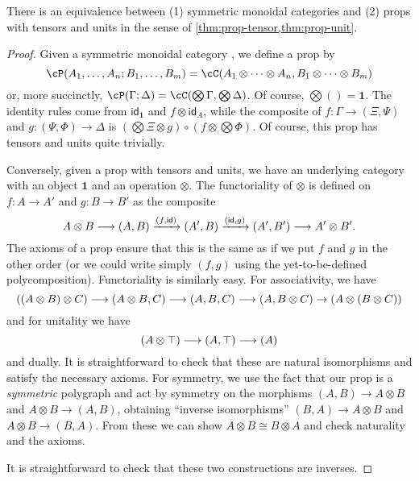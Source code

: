 \documentclass{book}
\def\idfunc{\mathsf{id}}
\def\unit{\top}%
\def\one{\mathbf{1}}
\let\tensor\otimes
\let\bigtensor\bigotimes
\begin{document}
\begin{thm}\label{thm:prop-smc}
  There is an equivalence between (1) symmetric monoidal categories and (2) props with tensors and units in the sense of \cref{thm:prop-tensor,thm:prop-unit}.
\end{thm}
\begin{proof}
  Given a symmetric monoidal category \cC, we define a prop \cP by
  \[ \cP(A_1,\dots,A_n ; B_1,\dots,B_m) = \cC(A_1\tensor \cdots\tensor A_n, B_1\tensor\cdots\tensor B_m)\]
  or, more succinctly, $\cP(\Gamma;\Delta) = \cC(\bigtensor\Gamma, \bigtensor\Delta)$.
  Of course, $\bigtensor() = \one$.
  The identity rules come from $\idfunc_\one$ and $f\tensor \idfunc_A$, while the composite of $f:\Gamma\to (\Xi,\Psi)$ and $g:(\Psi,\Phi)\to \Delta$ is $(\bigtensor\Xi \tensor g) \circ (f\tensor \bigtensor \Phi)$.
  Of course, this prop has tensors and units quite trivially.

  Conversely, given a prop with tensors and units, we have an underlying category with an object $\one$ and an operation $\tensor$.
  The functoriality of $\tensor$ is defined on $f:A\to A'$ and $g:B\to B'$ as the composite
  \[ A\tensor B \too (A,B) \xto{(f,\idfunc)} (A',B) \xto{(\idfunc,g)} (A',B') \too A'\tensor B'. \]
  The axioms of a prop ensure that this is the same as if we put $f$ and $g$ in the other order (or we could write simply $(f,g)$ using the yet-to-be-defined polycomposition).
  Functoriality is similarly easy.
  For associativity, we have
  \[ ((A\tensor B)\tensor C) \too (A\tensor B,C) \too (A,B,C) \too (A,B\tensor C) \to (A\tensor (B\tensor C)) \]
  and for unitality we have
  \[ (A\tensor \unit) \too (A,\unit) \too (A) \]
  and dually.
  It is straightforward to check that these are natural isomorphisms and satisfy the necessary axioms.
  For symmetry, we use the fact that our prop is a \emph{symmetric} polygraph and act by symmetry on the morphisms $(A,B)\to A\tensor B$ and $A\tensor B\to (A,B)$, obtaining ``inverse isomorphisms'' $(B,A) \to A\tensor B$ and $A\tensor B \to (B,A)$.
  From these we can show $A\tensor B \cong B\tensor A$ and check naturality and the axioms.

  It is straightforward to check that these two constructions are inverses.
\end{proof}
\end{document}
